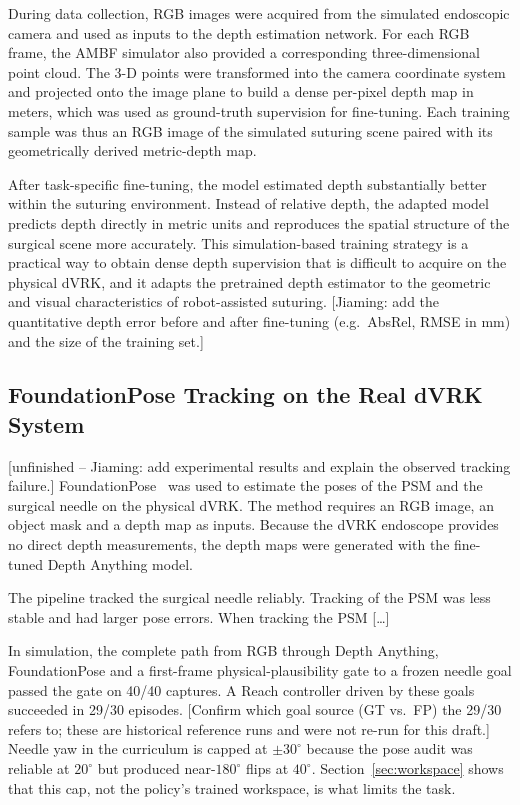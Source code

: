 \documentclass[letterpaper, 10 pt, conference]{ieeeconf}  %
\newcommand{\todo}[1]{{\color{cRed}[#1]}}
\begin{document}
During data collection, RGB images were acquired from the simulated endoscopic
camera and used as inputs to the depth estimation network. For each RGB frame,
the AMBF simulator also provided a corresponding three-dimensional point cloud.
The 3-D points were transformed into the camera coordinate system and projected
onto the image plane to build a dense per-pixel depth map in meters, which was
used as ground-truth supervision for fine-tuning. Each training sample was thus
an RGB image of the simulated suturing scene paired with its geometrically
derived metric-depth map.

After task-specific fine-tuning, the model estimated depth substantially better
within the suturing environment. Instead of relative depth, the adapted model
predicts depth directly in metric units and reproduces the spatial structure of
the surgical scene more accurately. This simulation-based training strategy is
a practical way to obtain dense depth supervision that is difficult to acquire
on the physical dVRK, and it adapts the pretrained depth estimator to the
geometric and visual characteristics of robot-assisted suturing.
\todo{Jiaming: add the quantitative depth error before and after fine-tuning
(e.g.\ AbsRel, RMSE in mm) and the size of the training set.}

\subsection{FoundationPose Tracking on the Real dVRK System}
\todo{unfinished -- Jiaming: add experimental results and explain the observed
tracking failure.}
FoundationPose~\cite{wen2024foundationpose} was used to estimate the poses of the
PSM and the surgical needle on the physical dVRK. The method requires an RGB
image, an object mask and a depth map as inputs. Because the dVRK endoscope
provides no direct depth measurements, the depth maps were generated with the
fine-tuned Depth Anything model.

The pipeline tracked the surgical needle reliably. Tracking of the PSM was less
stable and had larger pose errors. When tracking the PSM \todo{\ldots}

In simulation, the complete path from RGB through Depth Anything, FoundationPose
and a first-frame physical-plausibility gate to a frozen needle goal passed the
gate on 40/40 captures. A Reach controller driven by these goals succeeded in
29/30 episodes. \todo{Confirm which goal source (GT vs.\ FP) the 29/30 refers
to; these are historical reference runs and were not re-run for this draft.}
Needle yaw in the curriculum is capped at $\pm 30^\circ$ because the pose audit
was reliable at $20^\circ$ but produced near-$180^\circ$ flips at $40^\circ$.
Section~\ref{sec:workspace} shows that this cap, not the policy's trained
workspace, is what limits the task.
\end{document}
